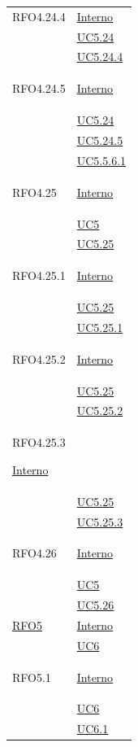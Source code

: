 \begin{longtable}{|>{\centering}m{5cm}|m{5cm}<{\centering}|}
\hypertarget{RFO4.24.4}{RFO4.24.4} &  \hyperlink{Interno}{Interno}\\
&\hyperref[UC5.24]{UC5.24}\\
&\hyperref[UC5.24.4]{UC5.24.4}\\ \hline

\hypertarget{RFO4.24.5}{RFO4.24.5} & \hyperlink{Interno}{Interno}\\
&\hyperref[UC5.24]{UC5.24}\\
&\hyperref[UC5.24.5]{UC5.24.5}\\
&\hyperref[UC5.5.6.1]{UC5.5.6.1}\\ \hline

\hypertarget{RFO4.25}{RFO4.25} & \hyperlink{Interno}{Interno}\\
&\hyperref[UC5]{UC5}\\
&\hyperref[UC5.25]{UC5.25}\\ \hline

\hypertarget{RFO4.25.1}{RFO4.25.1} &  \hyperlink{Interno}{Interno}\\
&\hyperref[UC5.25]{UC5.25}\\
&\hyperref[UC5.25.1]{UC5.25.1}\\ \hline

\hypertarget{RFO4.25.2}{RFO4.25.2} & \hyperlink{Interno}{Interno}\\
&\hyperref[UC5.25]{UC5.25}\\
&\hyperref[UC5.25.2]{UC5.25.2}\\ \hline

\hypertarget{RFO4.25.3}{RFO4.25.3}   \hyperlink{Interno}{Interno}\\
&\hyperref[UC5.25]{UC5.25}\\
&\hyperref[UC5.25.3]{UC5.25.3}\\ \hline

\hypertarget{RFO4.26}{RFO4.26} & \hyperlink{Interno}{Interno}\\
&\hyperref[UC5]{UC5}\\
&\hyperref[UC5.26]{UC5.26}\\ \hline


\hyperlink{RFO5}{RFO5} & \hyperlink{Interno}{Interno}\\
& \hyperref[UC6]{UC6}\\ \hline

\hypertarget{RFO5.1}{RFO5.1}&  \hyperlink{Interno}{Interno}\\
& \hyperref[UC6]{UC6}\\
& \hyperref[UC6.1]{UC6.1}\\ \hline


\end{longtable}
